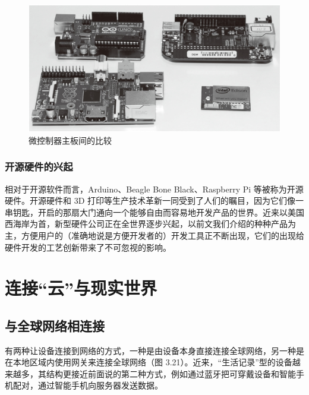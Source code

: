 \documentclass[12pt,UTF8]{ctexbook}
\begin{document}
\begin{figure}[htbp]
	\centering
	\includegraphics[width=1\linewidth]{71}
	\caption{微控制器主板间的比较}
	\label{fig:1}
\end{figure}

\subsubsection{开源硬件的兴起}

相对于开源软件而言，Arduino、Beagle Bone Black、Raspberry Pi 等被称为开源硬件。开源硬件和 3D 打印等生产技术革新一同受到了人们的瞩目，因为它们像一串钥匙，开启的那扇大门通向一个能够自由而容易地开发产品的世界。近来以美国西海岸为首，新型硬件公司正在全世界逐步兴起，以前文我们介绍的种种产品为主，方便用户的（准确地说是方便开发者的）开发工具正不断出现，它们的出现给硬件开发的工艺创新带来了不可忽视的影响。

\section{连接“云”与现实世界}

\subsection{与全球网络相连接}

有两种让设备连接到网络的方式，一种是由设备本身直接连接全球网络，另一种是在本地区域内使用网关来连接全球网络（图 3.21）。近来，“生活记录”型的设备越来越多，其结构更接近前面说的第二种方式，例如通过蓝牙把可穿戴设备和智能手机配对，通过智能手机向服务器发送数据。
\end{document}

